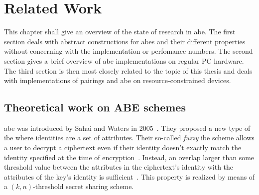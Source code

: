 \chapter{Related Work}

This chapter shall give an overview of the state of research in \acrshort{abe}.
The first section deals with abstract constructions for \acrshort{abes} and their different properties without concerning with the implementation or perfomance numbers.
The second section gives a brief overview of \acrshort{abe} implementations on regular PC hardware.
The third section is then most closely related to the topic of this thesis and deals with implementations of pairings and \acrshort{abe} on resource-constrained devices.



\section{Theoretical work on ABE schemes}
\acrlong{abe} was introduced by Sahai and Waters in 2005~\cite{sahai_fuzzy_2005}.
They proposed a new type of \gls{ibe} where identities are a set of attributes.
Their so-called \emph{fuzzy} \gls{ibe} scheme allows a user to decrypt a ciphertext even if their identity doesn't exactly match the identity specified at the time of encryption~\cite{sahai_fuzzy_2005}.
Instead, an overlap larger than some threshold value between the attributes in the ciphertext's identity with the attributes of the key's identity is sufficient~\cite{sahai_fuzzy_2005}.
This property is realized by means of a $(k, n)$-threshold secret sharing scheme.

